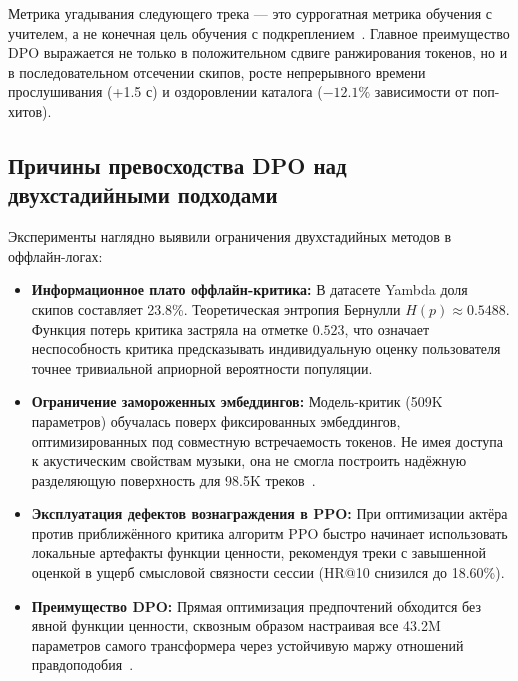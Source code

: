 Метрика угадывания следующего трека — это суррогатная метрика обучения с учителем, а не конечная цель обучения с подкреплением~\cite{volkov2026session}. Главное преимущество DPO выражается не только в положительном сдвиге ранжирования токенов, но и в последовательном отсечении скипов, росте непрерывного времени прослушивания (+1.5 с) и оздоровлении каталога ($-12.1\%$ зависимости от поп-хитов).

\subsection{Причины превосходства DPO над двухстадийными подходами}
Эксперименты наглядно выявили ограничения двухстадийных методов в оффлайн-логах:
\begin{itemize}
    \item \textbf{Информационное плато оффлайн-критика:} В датасете Yambda доля скипов составляет 23.8\%. Теоретическая энтропия Бернулли $H(p) \approx 0.5488$. Функция потерь критика застряла на отметке $0.523$, что означает неспособность критика предсказывать индивидуальную оценку пользователя точнее тривиальной априорной вероятности популяции.
    \item \textbf{Ограничение замороженных эмбеддингов:} Модель-критик (509K параметров) обучалась поверх фиксированных эмбеддингов, оптимизированных под совместную встречаемость токенов. Не имея доступа к акустическим свойствам музыки, она не смогла построить надёжную разделяющую поверхность для 98.5K треков~\cite{petrov2024aligning}.
    \item \textbf{Эксплуатация дефектов вознаграждения в PPO:} При оптимизации актёра против приближённого критика алгоритм PPO быстро начинает использовать локальные артефакты функции ценности, рекомендуя треки с завышенной оценкой в ущерб смысловой связности сессии (HR@10 снизился до 18.60\%).
    \item \textbf{Преимущество DPO:} Прямая оптимизация предпочтений обходится без явной функции ценности, сквозным образом настраивая все 43.2M параметров самого трансформера через устойчивую маржу отношений правдоподобия~\cite{rafailov2023direct}.
\end{itemize}

